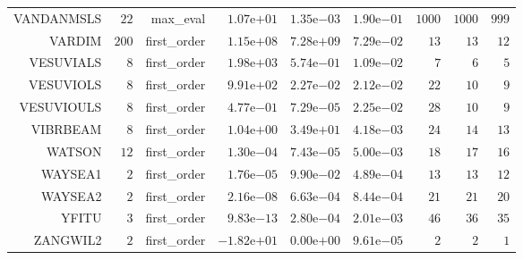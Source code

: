 \begin{longtable}{rrrrrrrrr}
VANDANMSLS & \(    22\) & max\_eval & \( 1.07\)e\(+01\) & \( 1.35\)e\(-03\) & \( 1.90\)e\(-01\) & \(  1000\) & \(  1000\) & \(   999\) \\
VARDIM & \(   200\) & first\_order & \( 1.15\)e\(+08\) & \( 7.28\)e\(+09\) & \( 7.29\)e\(-02\) & \(    13\) & \(    13\) & \(    12\) \\
VESUVIALS & \(     8\) & first\_order & \( 1.98\)e\(+03\) & \( 5.74\)e\(-01\) & \( 1.09\)e\(-02\) & \(     7\) & \(     6\) & \(     5\) \\
VESUVIOLS & \(     8\) & first\_order & \( 9.91\)e\(+02\) & \( 2.27\)e\(-02\) & \( 2.12\)e\(-02\) & \(    22\) & \(    10\) & \(     9\) \\
VESUVIOULS & \(     8\) & first\_order & \( 4.77\)e\(-01\) & \( 7.29\)e\(-05\) & \( 2.25\)e\(-02\) & \(    28\) & \(    10\) & \(     9\) \\
VIBRBEAM & \(     8\) & first\_order & \( 1.04\)e\(+00\) & \( 3.49\)e\(+01\) & \( 4.18\)e\(-03\) & \(    24\) & \(    14\) & \(    13\) \\
WATSON & \(    12\) & first\_order & \( 1.30\)e\(-04\) & \( 7.43\)e\(-05\) & \( 5.00\)e\(-03\) & \(    18\) & \(    17\) & \(    16\) \\
WAYSEA1 & \(     2\) & first\_order & \( 1.76\)e\(-05\) & \( 9.90\)e\(-02\) & \( 4.89\)e\(-04\) & \(    13\) & \(    13\) & \(    12\) \\
WAYSEA2 & \(     2\) & first\_order & \( 2.16\)e\(-08\) & \( 6.63\)e\(-04\) & \( 8.44\)e\(-04\) & \(    21\) & \(    21\) & \(    20\) \\
YFITU & \(     3\) & first\_order & \( 9.83\)e\(-13\) & \( 2.80\)e\(-04\) & \( 2.01\)e\(-03\) & \(    46\) & \(    36\) & \(    35\) \\
ZANGWIL2 & \(     2\) & first\_order & \(-1.82\)e\(+01\) & \( 0.00\)e\(+00\) & \( 9.61\)e\(-05\) & \(     2\) & \(     2\) & \(     1\) \\\hline
\end{longtable}
